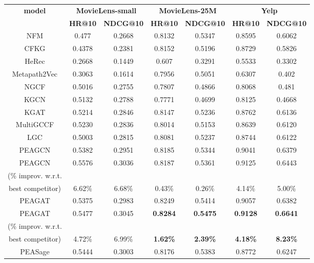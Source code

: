 \documentclass[runningheads, envcountsame, a4paper]{llncs}
\begin{document}
\begin{table*}[t!]
 \vspace{-3mm}
\centering
\begin{threeparttable}
\begin{tabular}{|c|c c|c c|c c|}
 \hline
  \multirow{2}{*}{\textbf{model}} &  \multicolumn{2}{c|}{\textbf{MovieLens-small}} & \multicolumn{2}{c|}{\textbf{MovieLens-25M}} & \multicolumn{2}{c|}{\textbf{Yelp}}\\\cline{2-7}
   &\textbf{HR@10} & \textbf{NDCG@10} & \textbf{HR@10} & \textbf{NDCG@10} & \textbf{HR@10} & \textbf{NDCG@10}\\
  \hline
    NFM & 0.477 & 0.2668 & 0.8132 & 0.5347 & 0.8595 & 0.6062\\
  \hline
    CFKG & 0.4378 & 0.2381 & 0.8152 & 0.5196 & 0.8729 & 0.5826\\
  \hline
    HeRec & 0.2668 & 0.1449 & 0.607 & 0.3291 & 0.5533 & 0.3302\\
    Metapath2Vec & 0.3063 & 0.1614 & 0.7956 & 0.5051 & 0.6307 & 0.402\\
  \hline
    NGCF & 0.5016 & 0.2755 & 0.7807 & 0.4866 & 0.8068 & 0.481\\
    KGCN & 0.5132 & 0.2788 & 0.7771 & 0.4699 & 0.8125 & 0.4668\\
    KGAT & 0.5214 & 0.2846 & 0.8147 & 0.5236 & 0.8762 & 0.6136\\
    MultiGCCF&  0.5230 & 0.2836 & 0.8014 & 0.5153 & 0.8639 & 0.6120\\
    LGC  & 0.5003 & 0.2815  & 0.8081 & 0.5237 & 0.8744 & 0.6122\\
  \hline
    \hline
    PEAGCN & 0.5382 & 0.2951 & 0.8185 & 0.5344 & 0.9041 & 0.6379\\
    PEAGCN\tnote{*} & 0.5576 & 0.3036 & 0.8187 & 0.5361 & 0.9125 & 0.6443\\
(\% improv. w.r.t. &&&&&&\\ best competitor) & 6.62\% & 6.68\% & 0.43\% & 0.26\% & 4.14\% & 5.00\%\\
  \hline    
    PEAGAT & 0.5375 & 0.2983 & 0.8249 & 0.5414 & 0.9057 & 0.6382\\
    PEAGAT\tnote{*} & 0.5477 & 0.3045 & \textbf{0.8284} & \textbf{0.5475} & \textbf{0.9128} & \textbf{0.6641}\\
(\% improv. w.r.t. &&&&&&\\ best competitor) & 4.72\% & 6.99\% & \textbf{1.62\%} & \textbf{2.39\%} & \textbf{4.18\%} & \textbf{8.23\%}\\
  \hline       
    PEASage & 0.5444 &  0.3003 & 0.8176 & 0.5383 & 0.8772 & 0.6247\\

\end{tabular}
\end{threeparttable}
\end{table*}
\end{document}
